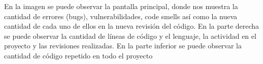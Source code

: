 En la imagen se puede observar la pantalla principal, donde nos muestra la cantidad de errores (bugs), vulnerabilidades, code smells así como la nueva cantidad de cada uno de ellos en la nueva revisión del código. En la parte derecha se puede observar la cantidad de líneas de código y el lenguaje, la actividad en el proyecto y las revisiones realizadas. En la parte inferior se puede observar la cantidad de código repetido en todo el proyecto
